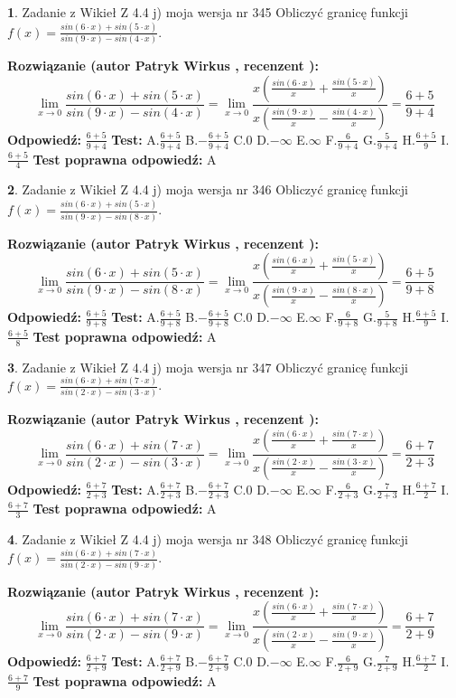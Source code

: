 \documentclass[12pt, a4paper]{article}
\theoremstyle{definition} %
\newtheorem{zad}{}
\newcommand{\zadStart}[1]{\begin{zad}#1\newline}
\newcommand{\zadStop}{\end{zad}}
\newcommand{\rozwStart}[2]{\noindent \textbf{Rozwiązanie (autor #1 , recenzent #2): }\newline}
\newcommand{\rozwStop}{\newline}
\newcommand{\odpStart}{\noindent \textbf{Odpowiedź:}\newline}
\newcommand{\odpStop}{\newline}
\newcommand{\testStart}{\noindent \textbf{Test:}\newline}
\newcommand{\testStop}{\newline}
\newcommand{\kluczStart}{\noindent \textbf{Test poprawna odpowiedź:}\newline}
\newcommand{\kluczStop}{\newline}
\begin{document}
\zadStart{Zadanie z Wikieł Z 4.4 j) moja wersja nr 345}
Obliczyć granicę funkcji $f(x)=\frac{sin(6\cdot x) +sin(5\cdot x)}{sin(9\cdot x) -sin(4\cdot x)}$.
\zadStop
\rozwStart{Patryk Wirkus}{}
$$\lim\limits_{x\to 0}\frac{sin(6\cdot x) +sin(5\cdot x)}{sin(9\cdot x) -sin(4\cdot x)}=\lim\limits_{x\to 0}\frac{x(\frac{sin(6\cdot x)}{x}+\frac{sin(5\cdot x)}{x})}{x(\frac{sin(9\cdot x)}{x}-\frac{sin(4\cdot x)}{x})}=\frac{6+5}{9+4}$$
\rozwStop
\odpStart
$\frac{6+5}{9+4}$
\odpStop
\testStart
A.$\frac{6+5}{9+4}$
B.$-\frac{6+5}{9+4}$
C.$0$
D.$-\infty$
E.$\infty$
F.$\frac{6}{9+4}$
G.$\frac{5}{9+4}$
H.$\frac{6+5}{9}$
I.$\frac{6+5}{4}$
\testStop
\kluczStart
A
\kluczStop



\zadStart{Zadanie z Wikieł Z 4.4 j) moja wersja nr 346}
Obliczyć granicę funkcji $f(x)=\frac{sin(6\cdot x) +sin(5\cdot x)}{sin(9\cdot x) -sin(8\cdot x)}$.
\zadStop
\rozwStart{Patryk Wirkus}{}
$$\lim\limits_{x\to 0}\frac{sin(6\cdot x) +sin(5\cdot x)}{sin(9\cdot x) -sin(8\cdot x)}=\lim\limits_{x\to 0}\frac{x(\frac{sin(6\cdot x)}{x}+\frac{sin(5\cdot x)}{x})}{x(\frac{sin(9\cdot x)}{x}-\frac{sin(8\cdot x)}{x})}=\frac{6+5}{9+8}$$
\rozwStop
\odpStart
$\frac{6+5}{9+8}$
\odpStop
\testStart
A.$\frac{6+5}{9+8}$
B.$-\frac{6+5}{9+8}$
C.$0$
D.$-\infty$
E.$\infty$
F.$\frac{6}{9+8}$
G.$\frac{5}{9+8}$
H.$\frac{6+5}{9}$
I.$\frac{6+5}{8}$
\testStop
\kluczStart
A
\kluczStop



\zadStart{Zadanie z Wikieł Z 4.4 j) moja wersja nr 347}
Obliczyć granicę funkcji $f(x)=\frac{sin(6\cdot x) +sin(7\cdot x)}{sin(2\cdot x) -sin(3\cdot x)}$.
\zadStop
\rozwStart{Patryk Wirkus}{}
$$\lim\limits_{x\to 0}\frac{sin(6\cdot x) +sin(7\cdot x)}{sin(2\cdot x) -sin(3\cdot x)}=\lim\limits_{x\to 0}\frac{x(\frac{sin(6\cdot x)}{x}+\frac{sin(7\cdot x)}{x})}{x(\frac{sin(2\cdot x)}{x}-\frac{sin(3\cdot x)}{x})}=\frac{6+7}{2+3}$$
\rozwStop
\odpStart
$\frac{6+7}{2+3}$
\odpStop
\testStart
A.$\frac{6+7}{2+3}$
B.$-\frac{6+7}{2+3}$
C.$0$
D.$-\infty$
E.$\infty$
F.$\frac{6}{2+3}$
G.$\frac{7}{2+3}$
H.$\frac{6+7}{2}$
I.$\frac{6+7}{3}$
\testStop
\kluczStart
A
\kluczStop



\zadStart{Zadanie z Wikieł Z 4.4 j) moja wersja nr 348}
Obliczyć granicę funkcji $f(x)=\frac{sin(6\cdot x) +sin(7\cdot x)}{sin(2\cdot x) -sin(9\cdot x)}$.
\zadStop
\rozwStart{Patryk Wirkus}{}
$$\lim\limits_{x\to 0}\frac{sin(6\cdot x) +sin(7\cdot x)}{sin(2\cdot x) -sin(9\cdot x)}=\lim\limits_{x\to 0}\frac{x(\frac{sin(6\cdot x)}{x}+\frac{sin(7\cdot x)}{x})}{x(\frac{sin(2\cdot x)}{x}-\frac{sin(9\cdot x)}{x})}=\frac{6+7}{2+9}$$
\rozwStop
\odpStart
$\frac{6+7}{2+9}$
\odpStop
\testStart
A.$\frac{6+7}{2+9}$
B.$-\frac{6+7}{2+9}$
C.$0$
D.$-\infty$
E.$\infty$
F.$\frac{6}{2+9}$
G.$\frac{7}{2+9}$
H.$\frac{6+7}{2}$
I.$\frac{6+7}{9}$
\testStop
\kluczStart
A
\kluczStop
\end{document}
